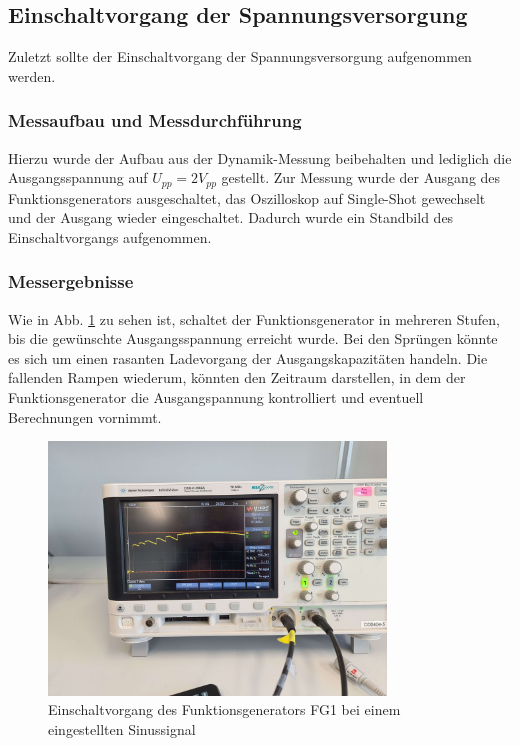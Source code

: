 \documentclass[a4paper]{article}
\begin{document}
\subsection{Einschaltvorgang der Spannungsversorgung}
Zuletzt sollte der Einschaltvorgang der Spannungsversorgung aufgenommen werden.

\subsubsection{Messaufbau und Messdurchführung}
Hierzu wurde der Aufbau aus der Dynamik-Messung beibehalten und lediglich die
Ausgangsspannung auf $U_{pp}=2\unit{V_{pp}}$ gestellt. Zur Messung wurde der
Ausgang des Funktionsgenerators ausgeschaltet, das Oszilloskop auf Single-Shot
gewechselt und der Ausgang wieder eingeschaltet. Dadurch wurde ein Standbild des
Einschaltvorgangs aufgenommen.

\subsubsection{Messergebnisse}
Wie in Abb. \ref{fig:images-Oszi-Einschaltvorgang-jpg} zu sehen ist, schaltet der
Funktionsgenerator in mehreren Stufen, bis die gewünschte Ausgangsspannung erreicht wurde.
Bei den Sprüngen könnte es sich um einen rasanten Ladevorgang der Ausgangskapazitäten
handeln. Die fallenden Rampen wiederum, könnten den Zeitraum darstellen, in dem
der Funktionsgenerator die Ausgangspannung kontrolliert und eventuell Berechnungen
vornimmt.

\begin{figure}[h]
    \centering
    \includegraphics[width=0.8\textwidth]{images/Oszi - Einschaltvorgang.jpg}
    \caption{Einschaltvorgang des Funktionsgenerators FG1 bei einem eingestellten Sinussignal}
    \label{fig:images-Oszi-Einschaltvorgang-jpg}
\end{figure}
\end{document}
